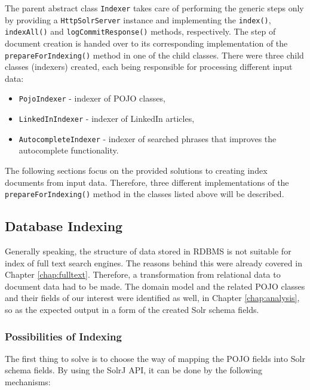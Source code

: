The parent abstract class \texttt{Indexer} takes care of performing the generic steps only by providing a \texttt{Http\-Solr\-Server} instance and implementing the \texttt{index()}, \texttt{index\-All()} and \texttt{log\-Commit\-Response()} methods, respectively. 
The step of document creation is handed over to its corresponding implementation of the \texttt{prepareForIndexing()} method  in one of the child classes.
There were three child classes (indexers) created, each being responsible for processing different input data:

\begin{itemize}
	\item \texttt{PojoIndexer} - indexer of POJO classes,
	\item \texttt{LinkedInIndexer} - indexer of LinkedIn articles,
	\item \texttt{AutocompleteIndexer} - indexer of searched phrases that improves the autocomplete functionality.
\end{itemize}

The following sections focus on the provided solutions to creating index documents from input data.
Therefore, three different implementations of the \texttt{prepareForIn\-de\-xing()} method in the classes listed above will be described.


\subsection{Database Indexing}

Generally speaking, the structure of data stored in RDBMS is not suitable for index of full text search engines.
The reasons behind this were already covered in Chapter \ref{chap:fulltext}.
Therefore, a transformation from relational data to document data had to be made.
The domain model and the related POJO classes and their fields of our interest were identified as well, in Chapter \ref{chap:analysis}, so as the expected output in a form of the created Solr schema fields. %

\subsubsection{Possibilities of Indexing}

The first thing to solve is to choose the way of mapping the POJO fields into Solr schema fields.
By using the SolrJ API, it can be done by the following mechanisms:

